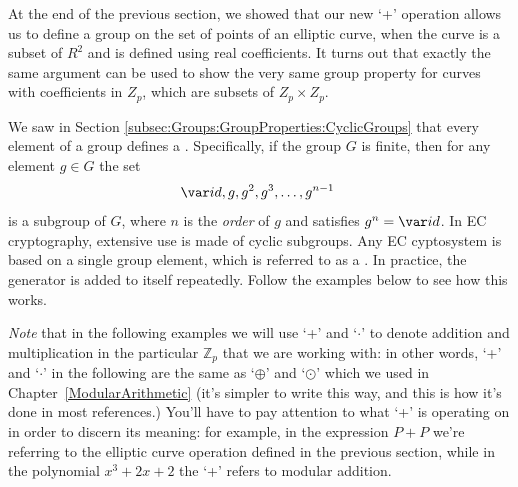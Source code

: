 At the end of the previous section, we showed that our new  `+' operation allows us to define a group on the set of points of an elliptic curve, when the curve is a subset of $R^2$ and is defined using real coefficients.  It turns out that exactly the same argument can be used to show the very same group property for curves with coefficients in $Z_p$, which are subsets of $Z_p \times Z_p$.  

We saw in Section \ref{subsec:Groups:GroupProperties:CyclicGroups} that every element of a group defines a . Specifically, if the group $G$ is finite, then for any element $g \in G$ the set 
\[ {\var id}, g, g^2, g^3, \ldots, g^{n-1} \ \]
is a subgroup of $G$, where $n$ is the \emph{order} of $g$ and satisfies $g^n = {\var id}$. In EC cryptography, extensive use is made of cyclic subgroups.  Any EC cyptosystem is based on a single group element, which is referred to as a .  In practice, the generator is added to itself repeatedly. Follow the examples below to see how this works.

\emph{Note} that in the following examples we will use `+'  and `$\cdot$' to denote addition and multiplication in the particular  $\mathbb{Z}_p$ that we are working with: in other words, `+' and `$\cdot$' in the following are the same as `$\oplus$' and `$\odot$' which we used in Chapter~\ref{ModularArithmetic}  (it's simpler to write this way, and this is how it's done in most references.) You'll have to pay attention to what `+' is operating on in order to discern its meaning:  for example, in the expression $P+P$ we're referring to the elliptic curve operation defined in the previous section, while in the polynomial $x^3 + 2x + 2$  the `+' refers to modular addition. 

